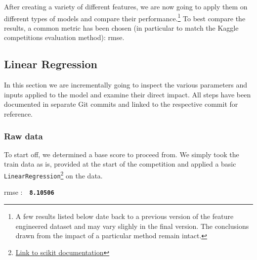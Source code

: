 \newcommand{\rmse}[1]{
	\vspace*{-2mm}
	\begin{center}
		\begin{tcolorbox}[colback=white, colframe=iwiPurple, halign=flush center, width=0.8\linewidth, boxrule=1pt, arc=4mm]
				\Acrshort{rmse} :\ \ \textbf{\texttt{#1}}
		\end{tcolorbox}
	\vspace*{-2mm}
	\end{center}
}


After creating a variety of different features, we are now going to apply them on different types of models and compare their performance.\footnote{A few results listed below date back to a previous version of the feature engineered dataset and may vary slighly in the final version. The conclusions drawn from the impact of a particular method remain intact.} To best compare the results, a common metric has been chosen (in particular to match the Kaggle competitions evaluation method): \acrfull{rmse}.

\subsection{Linear Regression}

In this section we are incrementally going to inspect the various parameters and inputs applied to the model and examine their direct impact. All steps have been documented in separate Git commits and linked to the respective commit for reference.

\subsubsection{Raw data}

To start off, we determined a base score to proceed from. We simply took the train data as is, provided at the start of the competition and applied a basic \texttt{LinearRegression}\footnote{\href{https://scikit-learn.org/stable/modules/generated/sklearn.linear_model.LinearRegression.html\#sklearn.linear_model.LinearRegression}{Link to \gls{scikit} documentation}} on the data.
\rmse{8.10506}


